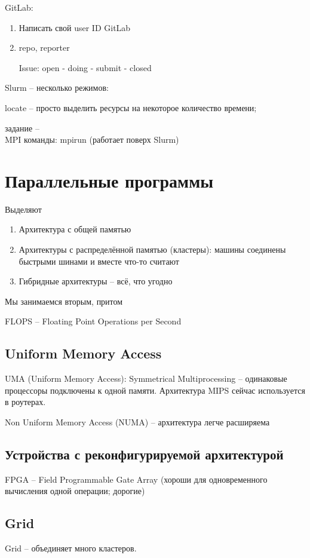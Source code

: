 \documentclass[main.tex]{subfiles}
\begin{document}
GitLab:
\begin{enumerate}[noitemsep]
	\item Написать свой user ID GitLab
	\item repo, reporter
	
	Issue: open - doing - submit - closed
\end{enumerate}

Slurm -- несколько режимов:

locate -- просто выделить ресурсы на некоторое количество времени;

задание -- \\

MPI команды: mpirun (работает поверх Slurm)

\section{Параллельные программы}

Выделяют
\begin{enumerate}[noitemsep]
	\item Архитектура с общей памятью
	\item Архитектуры с распределённой памятью (кластеры): машины соединены быстрыми шинами и вместе что-то считают
	\item Гибридные архитектуры -- всё, что угодно
\end{enumerate}

Мы занимаемся вторым, притом 

FLOPS -- Floating Point Operations per Second

\subsection{Uniform Memory Access}

UMA (Uniform Memory Access):
Symmetrical Multiprocessing -- одинаковые процессоры подключены к одной памяти.
Архитектура MIPS сейчас используется в роутерах.

Non Uniform Memory Access (NUMA) -- архитектура легче расширяема 

\subsection{Устройства с реконфигурируемой архитектурой}

FPGA -- Field Programmable Gate Array (хороши для одновременного вычисления одной операции; дорогие)

\subsection{Grid}
Grid -- объединяет много кластеров.
\end{document}

